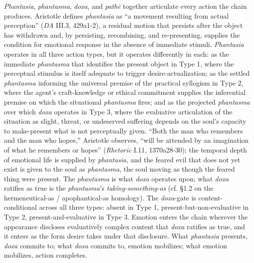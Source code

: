 \textit{Phantasia}, \textit{phantasma}, \textit{doxa}, and \textit{pathē} together articulate every action the chain produces. Aristotle defines \textit{phantasia} as ``a movement resulting from actual perception'' (\textit{DA} III.3, 429a1-2), a residual motion that persists after the object has withdrawn and, by persisting, recombining, and re-presenting, supplies the condition for emotional response in the absence of immediate stimuli. \textit{Phantasia} operates in all three action types, but it operates differently in each: as the immediate \textit{phantasma} that identifies the present object in Type 1, where the perceptual stimulus is itself adequate to trigger desire-actualization; as the settled \textit{phantasma} informing the universal premise of the practical syllogism in Type 2, where the agent's craft-knowledge or ethical commitment supplies the inferential premise on which the situational \textit{phantasma} fires; and as the projected \textit{phantasma} over which \textit{doxa} operates in Type 3, where the evaluative articulation of the situation as slight, threat, or undeserved suffering depends on the soul's capacity to make-present what is not perceptually given. ``Both the man who remembers and the man who hopes,'' Aristotle observes, ``will be attended by an imagination of what he remembers or hopes'' (\textit{Rhetoric} I.11, 1370a28-30); the temporal depth of emotional life is supplied by \textit{phantasia}, and the feared evil that does not yet exist is given to the soul as \textit{phantasma}, the soul moving as though the feared thing were present. The \textit{phantasma} is what \textit{doxa} operates upon; what \textit{doxa} ratifies as true is the \textit{phantasma}'s \textit{taking-something-as} (cf. \S 1.2 on the hermeneutical-as / apophantical-as homology). The \textit{doxa}-gate is content-conditional across all three types: absent in Type 1, present-but-non-evaluative in Type 2, present-and-evaluative in Type 3. Emotion enters the chain wherever the appearance discloses evaluatively complex content that \textit{doxa} ratifies as true, and it enters as the form desire takes under that disclosure. What \textit{phantasia} presents, \textit{doxa} commits to; what \textit{doxa} commits to, emotion mobilizes; what emotion mobilizes, action completes.

